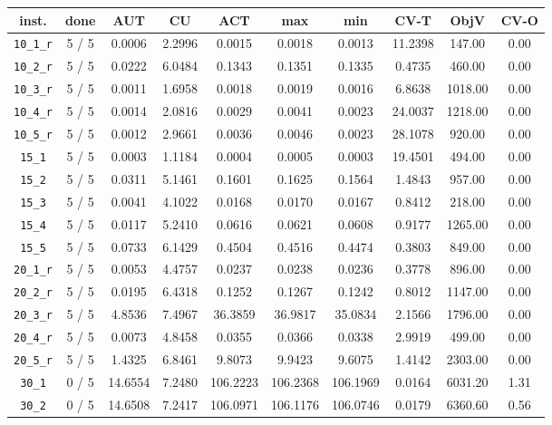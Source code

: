 \begin{table}[h!]
\begin{center}
\small
\begin{tabular}{| c | c | c | c | c | c | c | c | c | c |}
\hline
inst. & done & AUT & CU & ACT & max & min & CV-T & ObjV & CV-O \\
\hline
\verb|10_1_r| & 5 / 5 & 0.0006 & 2.2996 & 0.0015 & 0.0018 & 0.0013 & 11.2398 & 147.00 & 0.00\\ 
\verb|10_2_r| & 5 / 5 & 0.0222 & 6.0484 & 0.1343 & 0.1351 & 0.1335 & 0.4735 & 460.00 & 0.00\\ 
\verb|10_3_r| & 5 / 5 & 0.0011 & 1.6958 & 0.0018 & 0.0019 & 0.0016 & 6.8638 & 1018.00 & 0.00\\ 
\verb|10_4_r| & 5 / 5 & 0.0014 & 2.0816 & 0.0029 & 0.0041 & 0.0023 & 24.0037 & 1218.00 & 0.00\\ 
\verb|10_5_r| & 5 / 5 & 0.0012 & 2.9661 & 0.0036 & 0.0046 & 0.0023 & 28.1078 & 920.00 & 0.00\\ 
\verb|15_1| & 5 / 5 & 0.0003 & 1.1184 & 0.0004 & 0.0005 & 0.0003 & 19.4501 & 494.00 & 0.00\\ 
\verb|15_2| & 5 / 5 & 0.0311 & 5.1461 & 0.1601 & 0.1625 & 0.1564 & 1.4843 & 957.00 & 0.00\\ 
\verb|15_3| & 5 / 5 & 0.0041 & 4.1022 & 0.0168 & 0.0170 & 0.0167 & 0.8412 & 218.00 & 0.00\\ 
\verb|15_4| & 5 / 5 & 0.0117 & 5.2410 & 0.0616 & 0.0621 & 0.0608 & 0.9177 & 1265.00 & 0.00\\ 
\verb|15_5| & 5 / 5 & 0.0733 & 6.1429 & 0.4504 & 0.4516 & 0.4474 & 0.3803 & 849.00 & 0.00\\ 
\verb|20_1_r| & 5 / 5 & 0.0053 & 4.4757 & 0.0237 & 0.0238 & 0.0236 & 0.3778 & 896.00 & 0.00\\ 
\verb|20_2_r| & 5 / 5 & 0.0195 & 6.4318 & 0.1252 & 0.1267 & 0.1242 & 0.8012 & 1147.00 & 0.00\\ 
\verb|20_3_r| & 5 / 5 & 4.8536 & 7.4967 & 36.3859 & 36.9817 & 35.0834 & 2.1566 & 1796.00 & 0.00\\ 
\verb|20_4_r| & 5 / 5 & 0.0073 & 4.8458 & 0.0355 & 0.0366 & 0.0338 & 2.9919 & 499.00 & 0.00\\ 
\verb|20_5_r| & 5 / 5 & 1.4325 & 6.8461 & 9.8073 & 9.9423 & 9.6075 & 1.4142 & 2303.00 & 0.00\\ 
\verb|30_1| & 0 / 5 & 14.6554 & 7.2480 & 106.2223 & 106.2368 & 106.1969 & 0.0164 & 6031.20 & 1.31\\ 
\verb|30_2| & 0 / 5 & 14.6508 & 7.2417 & 106.0971 & 106.1176 & 106.0746 & 0.0179 & 6360.60 & 0.56\\ 

\end{tabular}
\end{center}
\end{table}
